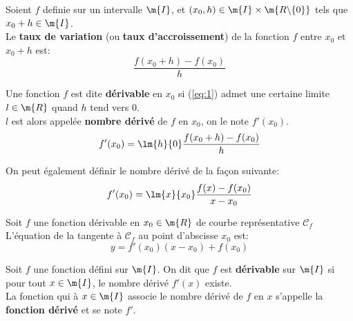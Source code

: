 \def\theme{Nombre dérivé. Fonction dérivée.}
\def\date{09/10/2023}


Soient $f$ definie sur un intervalle $\m{I}$,
et $(x_0,h)\in\m{I}\times\m{R\backslash\{0\}}$
tels que $x_0+h\in\m{I}$.\\
Le \textbf{taux de variation} (ou \textbf{taux d'accroissement}) de la fonction $f$ entre $x_0$ et $x_0+h$ est:
\begin{equation}\label{eq:1}
    \frac{f(x_0+h)-f(x_0)}{h}
\end{equation}

Une fonction $f$ est dite \textbf{dérivable} en $x_0$ si (\ref{eq:1})
admet une certaine limite $l\in\m{R}$ quand $h$ tend vers $0$.\\
$l$ est alors appelée \textbf{nombre dérivé} de $f$ en $x_0$, on le note $f'(x_0)$.\\
\begin{equation*}
    f'(x_0) = \lm{h}{0}\frac{f(x_0+h)-f(x_0)}{h}
\end{equation*}

\rmq{}
On peut également définir le nombre dérivé de la façon suivante:
\begin{equation*}
    f'(x_0) = \lm{x}{x_0}\frac{f(x)-f(x_0)}{x-x_0}
\end{equation*}

\pr{}
Soit $f$ une fonction dérivable en $x_0\in\m{R}$ de courbe représentative $\mathscr{C}_f$\\
L'équation de la tangente à $\mathscr{C}_f$ au point d'abscisse $x_0$ est:
\begin{equation*}
    y = f'(x_0)(x-x_0) + f(x_0)
\end{equation*}

Soit $f$ une fonction défini sur $\m{I}$. On dit que $f$ est \textbf{dérivable} sur $\m{I}$ si pour tout $x\in\m{I}$,
le nombre dérivé $f'(x)$ existe.\\
La fonction qui à $x\in\m{I}$ associe le nombre dérivé de $f$ en $x$ s'appelle la \textbf{fonction dérivé} et se note $f'$.

\newpage


